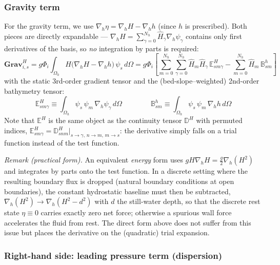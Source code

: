 \documentclass{article}
\newcommand{\nablah}{\nabla_h}
\newcommand{\Nh}{N_h}
\newcommand{\sumNhm}{\sum_{m=0}^{\Nh}}
\newcommand{\sumNh}[1]{\sum_{#1=0}^{\Nh}}
\newcommand{\Hm}{\hat{H}_m}
\newcommand{\HDsnma}{\mathbb{D}_{snm}^H}
\newcommand{\HttD}{\mathbb{D}^H}
\begin{document}
\subsubsection*{Gravity term}

For the gravity term, we use $\nablah\eta = \nablah H - \nablah h$ (since $h$ is prescribed). Both pieces are directly expandable — $\nablah H = \sumNh{\gamma}\hat{H}_\gamma\nablah\psi_\gamma$ contains only first derivatives of the basis, so \emph{no} integration by parts is required:
$$\mathbf{Grav}_{i,s}^H = g\Phi_i\int_{\Omega_h}H\big(\nablah H - \nablah h\big)\,\psi_s\,d\Omega
= g\Phi_i\left[ \sumNhm\sumNh{\gamma}\Hm\hat{H}_\gamma\,\mathbb{E}^H_{sm\gamma} - \sumNhm\Hm\,\mathbb{B}^h_{sm} \right]$$
with the static 3rd-order gradient tensor and the (bed-slope--weighted) 2nd-order bathymetry tensor:
\begin{equation}
    \boxed{\mathbb{E}^H_{sm\gamma} \equiv \int_{\Omega_h}\psi_s\,\psi_m\,\nablah\psi_\gamma\,d\Omega}
    \qquad\qquad
    \boxed{\mathbb{B}^h_{sm} \equiv \int_{\Omega_h}\psi_s\,\psi_m\,\nablah h\,d\Omega}
    \label{eq: def horizontal gravity tensors}
\end{equation}
Note that $\mathbb{E}^H$ is the same object as the continuity tensor $\HttD$ with permuted indices, $\mathbb{E}^H_{sm\gamma} = \HDsnma\big|_{s\to\gamma,\,n\to m,\,m\to s}$: the derivative simply falls on a trial function instead of the test function.

\medskip
\noindent\textit{Remark (practical form).} An equivalent \emph{energy} form uses $gH\nablah H = \tfrac{g}{2}\nablah(H^2)$ and integrates by parts onto the test function. In a discrete setting where the resulting boundary flux is dropped (natural boundary conditions at open boundaries), the constant hydrostatic baseline must then be subtracted, $\nablah(H^2)\to\nablah(H^2-d^2)$ with $d$ the still-water depth, so that the discrete rest state $\eta\equiv 0$ carries exactly zero net force; otherwise a spurious wall force accelerates the fluid from rest. The direct form above does not suffer from this issue but places the derivative on the (quadratic) trial expansion.
 
\subsubsection*{Right-hand side: leading pressure term (dispersion)}
\end{document}
